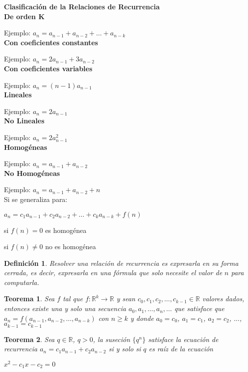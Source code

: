 \documentclass[a4paper,12pt]{report}
\newtheorem*{teo}{Teorema}
\newtheorem*{dfn}{Definición}
\begin{document}
\textbf{Clasificación de la Relaciones de Recurrencia}
 \\

 \textbf{De orden K}
 
 Ejemplo: $a_n=a_{n-1}+a_{n-2}+\dots+a_{n-k}$\\
 
  \textbf{Con coeficientes constantes}
  
  Ejemplo: $a_n=2a_{n-1}+3a_{n-2}$\\

  \textbf{Con coeficientes variables}
  
  Ejemplo: $a_n=(n-1)a_{n-1}$\\
  
  \textbf{Lineales}
  
  Ejemplo: $a_n=2a_{n-1}$\\
  
  \textbf{No Lineales}
  
  Ejemplo: $a_n=2a_{n-1}^2$\\
  
  \textbf{Homogéneas}
 
 Ejemplo: $a_n=a_{n-1}+a_{n-2}$\\
 
 \textbf{No Homogéneas}
 
 Ejemplo: $a_n=a_{n-1}+a_{n-2} + n$\\
 
 
 Si se generaliza para: 
 
 $a_n=c_1a_{n-1}+c_2a_{n-2}+\dots+c_ka_{n-k}+f(n)$
 
 si $f(n)=0$ es homogénea
 
 si $f(n)\neq 0$ no es homogénea
 
 
 \begin{dfn}
  Resolver una relación de recurrencia es expresarla en su forma cerrada, es decir, expresarla en una fórmula que solo necesite el valor de $n$ para computarla.
 \end{dfn}

 
 \begin{teo}
  Sea $f$ tal que $f:\mathbb{R}^k\rightarrow \mathbb{R}$ y sean $c_0,c_1,c_2,\dots,c_{k-1}\in\mathbb{R}$ valores dados, entonces existe una y solo una secuencia $a_0,a_1,\dots,a_n,\dots$ que satisface que $a_n=f(a_{n-1},a_{n-2},\dots,a_{n-k})$ con $n\geq k$ y donde $a_0=c_0$, $a_1=c_1$, $a_2=c_2$, $\dots$, $a_{k-1}=c_{k-1}$
 \end{teo}

 \begin{teo}
  Sea $q\in \mathbb{R}$, $q>0$, la suseción $\{q^n\}$ satisface la ecuación de recurrencia $a_n=c_1a_{n-1}+c_2a_{n-2}$ si y solo si $q$ es raíz de la ecuación 
  
  $x^2-c_1x-c_2=0$
 \end{teo}
 
\end{document}
